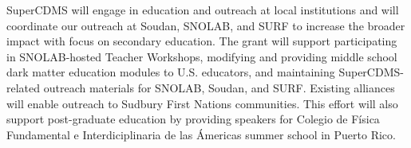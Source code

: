 SuperCDMS will engage in education and outreach at local institutions and will coordinate our outreach at Soudan, SNOLAB, and SURF to increase the broader impact with focus on secondary education. The grant will support participating in SNOLAB-hosted Teacher Workshops, modifying and providing middle school dark matter education modules to U.S. educators, and maintaining SuperCDMS-related outreach materials for SNOLAB, Soudan, and SURF. Existing alliances will enable outreach to Sudbury First Nations communities. This effort will also support post-graduate education by providing speakers for Colegio de F\'{i}sica Fundamental e Interdiciplinaria de las \'{A}mericas summer school in Puerto Rico.

